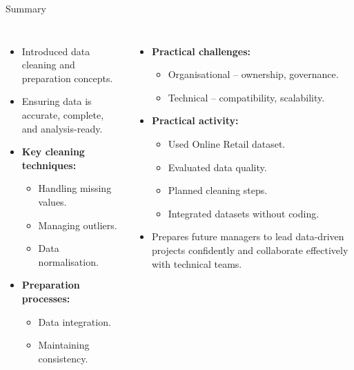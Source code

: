 \documentclass[aspectratio=169, table]{beamer}
\begin{document}
\begin{frame}{Summary}
	\vspace{10pt}
	
	\begin{columns}[T]
		\begin{itemize}
			\item Introduced data cleaning and preparation concepts.
			\item Ensuring data is accurate, complete, and analysis-ready.
			\item \textbf{Key cleaning techniques:}
			\begin{itemize}
				\item Handling missing values.
				\item Managing outliers.
				\item Data normalisation.
			\end{itemize}
			\item \textbf{Preparation processes:}
			\begin{itemize}
				\item Data integration.
				\item Maintaining consistency.
			\end{itemize}
		\end{itemize}
		
		\begin{itemize}
			\item \textbf{Practical challenges:}
			\begin{itemize}
				\item Organisational – ownership, governance.
				\item Technical – compatibility, scalability.
			\end{itemize}
			\item \textbf{Practical activity:}
			\begin{itemize}
				\item Used Online Retail dataset.
				\item Evaluated data quality.
				\item Planned cleaning steps.
				\item Integrated datasets without coding.
			\end{itemize}
			\item Prepares future managers to lead data-driven projects confidently and collaborate effectively with technical teams.
		\end{itemize}
	\end{columns}
	
\end{frame}
\end{document}
